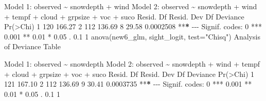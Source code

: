 \documentclass[
]{article}
\newenvironment{Shaded}{\begin{snugshade}}{\end{snugshade}}
\newcommand{\AttributeTok}[1]{\textcolor[rgb]{0.77,0.63,0.00}{#1}}
\newcommand{\DecValTok}[1]{\textcolor[rgb]{0.00,0.00,0.81}{#1}}
\newcommand{\ErrorTok}[1]{\textcolor[rgb]{0.64,0.00,0.00}{\textbf{#1}}}
\newcommand{\FloatTok}[1]{\textcolor[rgb]{0.00,0.00,0.81}{#1}}
\newcommand{\FunctionTok}[1]{\textcolor[rgb]{0.00,0.00,0.00}{#1}}
\newcommand{\NormalTok}[1]{#1}
\newcommand{\SpecialCharTok}[1]{\textcolor[rgb]{0.00,0.00,0.00}{#1}}
\newcommand{\StringTok}[1]{\textcolor[rgb]{0.31,0.60,0.02}{#1}}
\begin{document}
\begin{Shaded}
\begin{Highlighting}[]
\NormalTok{Model }\DecValTok{1}\SpecialCharTok{:}\NormalTok{ observed }\SpecialCharTok{\textasciitilde{}}\NormalTok{ snowdepth }\SpecialCharTok{+}\NormalTok{ wind}
\NormalTok{Model }\DecValTok{2}\SpecialCharTok{:}\NormalTok{ observed }\SpecialCharTok{\textasciitilde{}}\NormalTok{ snowdepth }\SpecialCharTok{+}\NormalTok{ wind }\SpecialCharTok{+}\NormalTok{ tempf }\SpecialCharTok{+}\NormalTok{ cloud }\SpecialCharTok{+}\NormalTok{ grpsize }\SpecialCharTok{+}\NormalTok{ voc }\SpecialCharTok{+} 
\NormalTok{    suco}
\NormalTok{  Resid. Df Resid. Dev Df Deviance  }\FunctionTok{Pr}\NormalTok{(}\SpecialCharTok{\textgreater{}}\NormalTok{Chi)    }
\DecValTok{1}       \DecValTok{120}     \FloatTok{166.27}                          
\DecValTok{2}       \DecValTok{112}     \FloatTok{136.69}  \DecValTok{8}    \FloatTok{29.58} \FloatTok{0.0002508} \SpecialCharTok{**}\ErrorTok{*}
\SpecialCharTok{{-}{-}{-}}
\NormalTok{Signif. codes}\SpecialCharTok{:}  \DecValTok{0} \StringTok{\textquotesingle{}***\textquotesingle{}} \FloatTok{0.001} \StringTok{\textquotesingle{}**\textquotesingle{}} \FloatTok{0.01} \StringTok{\textquotesingle{}*\textquotesingle{}} \FloatTok{0.05} \StringTok{\textquotesingle{}.\textquotesingle{}} \FloatTok{0.1} \StringTok{\textquotesingle{} \textquotesingle{}} \DecValTok{1}
\FunctionTok{anova}\NormalTok{(new6\_glm, sight\_logit, }\AttributeTok{test=}\StringTok{"Chisq"}\NormalTok{)}
\NormalTok{Analysis of Deviance Table}

\NormalTok{Model }\DecValTok{1}\SpecialCharTok{:}\NormalTok{ observed }\SpecialCharTok{\textasciitilde{}}\NormalTok{ snowdepth}
\NormalTok{Model }\DecValTok{2}\SpecialCharTok{:}\NormalTok{ observed }\SpecialCharTok{\textasciitilde{}}\NormalTok{ snowdepth }\SpecialCharTok{+}\NormalTok{ wind }\SpecialCharTok{+}\NormalTok{ tempf }\SpecialCharTok{+}\NormalTok{ cloud }\SpecialCharTok{+}\NormalTok{ grpsize }\SpecialCharTok{+}\NormalTok{ voc }\SpecialCharTok{+} 
\NormalTok{    suco}
\NormalTok{  Resid. Df Resid. Dev Df Deviance  }\FunctionTok{Pr}\NormalTok{(}\SpecialCharTok{\textgreater{}}\NormalTok{Chi)    }
\DecValTok{1}       \DecValTok{121}     \FloatTok{167.10}                          
\DecValTok{2}       \DecValTok{112}     \FloatTok{136.69}  \DecValTok{9}    \FloatTok{30.41} \FloatTok{0.0003735} \SpecialCharTok{**}\ErrorTok{*}
\SpecialCharTok{{-}{-}{-}}
\NormalTok{Signif. codes}\SpecialCharTok{:}  \DecValTok{0} \StringTok{\textquotesingle{}***\textquotesingle{}} \FloatTok{0.001} \StringTok{\textquotesingle{}**\textquotesingle{}} \FloatTok{0.01} \StringTok{\textquotesingle{}*\textquotesingle{}} \FloatTok{0.05} \StringTok{\textquotesingle{}.\textquotesingle{}} \FloatTok{0.1} \StringTok{\textquotesingle{} \textquotesingle{}} \DecValTok{1}
\end{Highlighting}
\end{Shaded}
\end{document}
